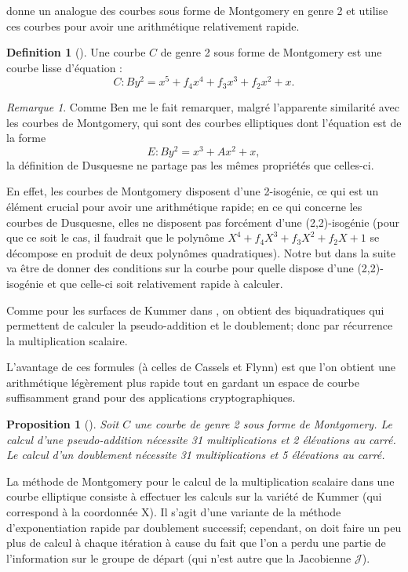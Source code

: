 \documentclass[a4paper,12pt]{article}
\newtheorem{proposition}[theoreme]{Proposition}
\theoremstyle{definition}
\newtheorem{definition}{Definition}[section]
\theoremstyle{remark}
\newtheorem{remarque}{Remarque}
\numberwithin{equation}{section}
\begin{document}
\citet{duquesne} donne un analogue des courbes sous forme de Montgomery en genre 2 et utilise ces courbes pour avoir une arithmétique relativement rapide.

\begin{definition}[\citep{duquesne}]
Une courbe $C$ de genre 2 sous forme de Montgomery est une courbe lisse d'équation :
$$C : By^2 = x^5 + f_4x^4 + f_3x^3 + f_2x^2 + x.$$
\end{definition}

\begin{remarque}
Comme Ben me le fait remarquer, malgré l'apparente similarité avec les courbes de Montgomery, qui sont des courbes elliptiques dont l'équation est de la forme
$$E : By^2 = x^3 + Ax^2 + x,$$
la définition de Dusquesne ne partage pas les mêmes propriétés que celles-ci.

En effet, les courbes de Montgomery disposent d'une 2-isogénie, ce qui est un élément crucial pour avoir une arithmétique rapide; en ce qui concerne les courbes de Dusquesne, elles ne disposent pas forcément d'une (2,2)-isogénie (pour que ce soit le cas, il faudrait que le polynôme $X^4+f_4X^3+f_3X^2+f_2X+1$ se décompose en produit de deux polynômes quadratiques). Notre but dans la suite va être de donner des conditions sur la courbe pour quelle dispose d'une (2,2)-isogénie et que celle-ci soit relativement rapide à calculer.
\end{remarque}

Comme pour les surfaces de Kummer dans \citep{cassels-Flynn}, on obtient des biquadratiques qui permettent de calculer la pseudo-addition et le doublement; donc par récurrence la multiplication scalaire.

L'avantage de ces formules (à celles de Cassels et Flynn) est que l'on obtient une arithmétique légèrement plus rapide tout en gardant un espace de courbe suffisamment grand pour des applications cryptographiques.

\begin{proposition}[\citet{duquesne}]
\label{propDuquesne}
Soit $C$ une courbe de genre 2 sous forme de Montgomery. Le calcul d'une pseudo-addition nécessite 31 multiplications et 2 élévations au carré. Le calcul d'un doublement nécessite 31 multiplications et 5 élévations au carré.
\end{proposition}

La méthode de Montgomery pour le calcul de la multiplication scalaire dans une courbe elliptique consiste à effectuer les calculs sur la variété de Kummer (qui correspond à la coordonnée X). Il s'agit d'une variante de la méthode d'exponentiation rapide par doublement successif; cependant, on doit faire un peu plus de calcul à chaque itération à cause du fait que l'on a perdu une partie de l'information sur le groupe de départ (qui n'est autre que la Jacobienne $\mathcal{J}$).
\end{document}
